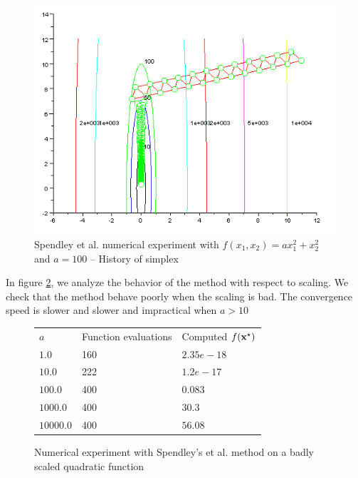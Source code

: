 \begin{figure}
\begin{center}
\includegraphics[width=15cm]{spendleymethod/quad2-spendley-simplexcontours.png}
\end{center}
\caption{Spendley et al. numerical experiment with $f(x_1,x_2) = a x_1^2 + x_2^2$ and $a=100$ -- History of simplex}
\label{fig-spendley-numexp2-historysimplex}
\end{figure}

In figure \ref{fig-spendley-numexp2-scaling}, we analyze the 
behavior of the method with respect to scaling.
We check that the method behave poorly when the scaling is 
bad. The convergence speed is slower and slower and impractical 
when $a>10$

\begin{figure}[htbp]
\begin{center}
\begin{tabular}{|l|l|l|}
\hline
$a$ & Function evaluations & Computed $f(\mathbf{x}^\star)$ \\
$1.0$ & 160 & $2.35e-18$ \\
$10.0$ & 222 & $1.2e-17$ \\
$100.0$ & 400 & $0.083$ \\
$1000.0$ & 400 & $30.3$ \\
$10000.0$ & 400 & $56.08$ \\
\hline
\end{tabular}
\end{center}
\caption{Numerical experiment with Spendley's et al. method on a badly scaled quadratic function}
\label{fig-spendley-numexp2-scaling}
\end{figure}

